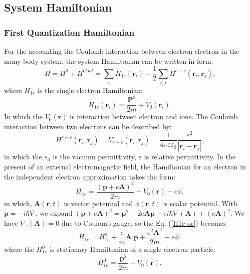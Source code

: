 \documentclass[12pt,english,a4paper]{article}
\begin{document}
	\subsection{System Hamiltonian}
	\subsubsection{First Quantization Hamiltonian}
\quad For the accounting the Coulomb interaction between electron-electron in the many-body system, the system Hamiltonian can be written in form:
	\begin{equation}
		H = H^0 +H^{Coul} = \sum_{i}H_{1e}(\textbf{r}_i) + \frac{1}{2}\sum_{i,j}H^{e-e}(\textbf{r}_i, \textbf{r}_j),
	\end{equation}
where $H_{1e}$ is the single electron Hamiltonian:
	\begin{equation}
		H_{1e}(\textbf{r}_i) = \frac{\textbf{P}^2}{2m} + V_0(\textbf{r}_i).
	\end{equation}
\quad In which the $V_0 (\textbf{r})$ is interaction between electron and ions. The Coulomb interaction between two electrons can be described by:
	\begin{equation}
		\label{H ee}
		H^{e-e}(\textbf{r}_i, \textbf{r}_j) = V_{e-e}(\textbf{r}_i, \textbf{r}_j) = \frac{1}{4\pi \varepsilon \varepsilon_0}\frac{e^2}{|\textbf{r}_i-\textbf{r}_j|},
	\end{equation}
in which the $\varepsilon_0$ is the vacuum permittivity, $\varepsilon$ is relative permittivity. In the present of an external electromagnetic field, the Hamiltonian for an electron in the independent electron approximation takes the form:
	\begin{equation}
		\label{H1e or}
		H_{1e} = \frac{(\textbf{p} + e \textbf{A})^2}{2m} + V_0(\textbf{r}) -e\phi,
	\end{equation}
in which, $\textbf{A}(\textbf{r},t)$ is vector potential and $\phi(\textbf{r},t)$ is scalar potential. With $\textbf{p} = - i\hbar\nabla$, we expand $(\textbf{p}+e\textbf{A})^2 = \textbf{p}^2 + 2e\textbf{A}\textbf{p} + ei \hbar \nabla(\textbf{A}) + (e\textbf{A})^2$. We have $\nabla.(\textbf{A}) = 0$ due to Coulomb gauge, so the Eq. (\ref{H1e or}) becomes
	\begin{equation}
		\label{expand H1e}
		H_{1e} = H^0_{1e} + \frac{e}{m} \textbf{A}.\textbf{p} + \frac{e^2 \textbf{A}^2}{2m} - e\phi,
	\end{equation}
where the $H^0_{1e}$ is stationary Hamiltonian of a single electron particle:
	\begin{equation}
		\label{H01e}
		H^0_{1e} = \frac{\textbf{p}^2}{2m} +V_0 (\textbf{r}),
	\end{equation}
\end{document}
